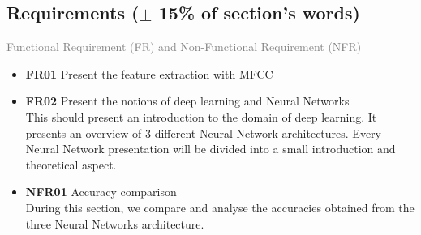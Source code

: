 \subsection{Requirements ($\pm$ 15\% of section's words)}

\textcolor{gray}{Functional Requirement (FR) and Non-Functional Requirement
  (NFR)} 
\begin{itemize} 
  \item \textbf{FR01} Present the feature extraction with MFCC \\
  \item \textbf{FR02} Present the notions of deep learning and Neural Networks\\
    This should present an introduction to the domain of deep learning. It
    presents an overview of 3 different Neural Network architectures.  Every
    Neural Network presentation will be divided into a small introduction and
    theoretical aspect.\\
  \item \textbf{NFR01} Accuracy comparison\\
    During this section, we compare and analyse the accuracies obtained from the
    three Neural Networks architecture.
\end{itemize}
